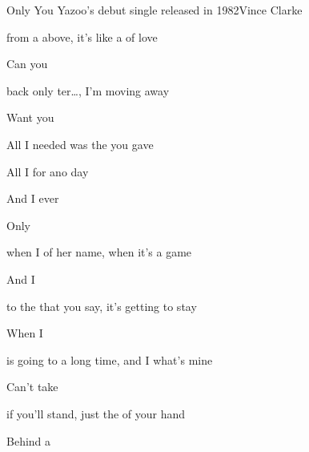 \begin{SBSong}{Only You}
  {Yazoo's debut single released in 1982}{Vince Clarke}
  \mediumchords
  \smallchords
  \begin{SBVerse}
     from a  above,
       it's like a  of love 
    
    Can you  

     back only ter\ldots{},
      I'm moving  away 

    Want you  
  \end{SBVerse}
  \begin{SBChorus}
  
     All I needed was the  you gave

    All I  for ano day

    And  I ever  \SBDirection{$\downarrow\downarrow\downarrow\downarrow$} 

    Only        
  \end{SBChorus}
  \begin{SBVerse}
     when I  of her name,
       when it's  a game 

    And I  

     to the  that you say,
       it's getting  to stay  

    When I  
  \end{SBVerse}
  \begin{SBVerse}
     is going to  a long time,
       and I  what's mine 

    Can't take  

     if you'll stand,
       just the  of your hand 

    Behind a  
  \end{SBVerse}
\end{SBSong}
